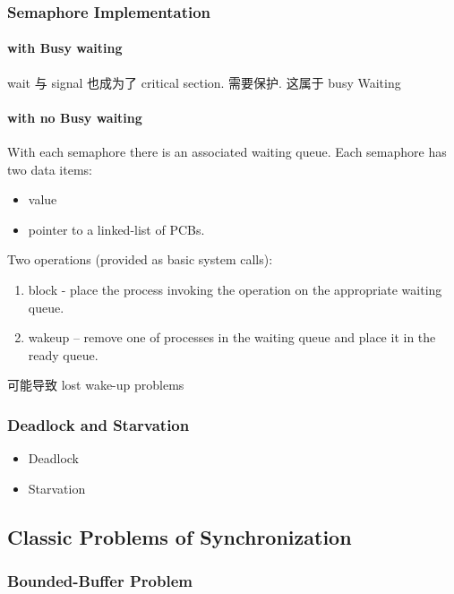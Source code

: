 \subsubsection{Semaphore Implementation}
\paragraph{with Busy waiting}
wait 与 signal 也成为了 critical section. 需要保护. 这属于 busy Waiting

\paragraph{with no Busy waiting} With each semaphore there is an associated waiting queue. Each semaphore has two data items:
\begin{itemize}
    \item value 
    \item pointer to a linked-list of PCBs.
\end{itemize}

Two operations (provided as basic system calls):
\begin{enumerate}
    \item block - place the process invoking the operation on the appropriate waiting queue. 
    \item wakeup – remove one of processes in the waiting queue
    and place it in the ready queue.
\end{enumerate}

可能导致 lost wake-up problems

\subsubsection{Deadlock and Starvation}%
\begin{itemize}
    \item Deadlock 
    \item Starvation 
\end{itemize}


\subsection{Classic Problems of Synchronization}

\subsubsection{Bounded-Buffer Problem}

